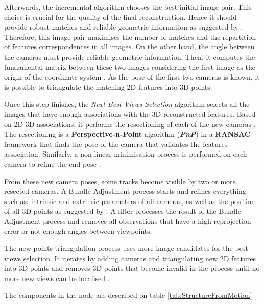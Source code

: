 \documentclass[12pt]{report}
\begin{document}
Afterwards, the incremental algorithm chooses the best initial image pair. This choice is crucial for the quality of the final reconstruction. Hence it should provide robust matches and reliable geometric information as suggested by \citet*{Moulon2012}.
Therefore, this image pair maximises the number of matches and the repartition of features correspondences in all images. On the other hand, the angle between the cameras must provide reliable geometric information.
Then, it computes the fundamental matrix between these two images considering the first image as the origin of the coordinate system . As the pose of the first two cameras is known, 
it is possible to triangulate the matching 2D features into 3D points. 

Once this step finishes, the \textit{Next Best Views Selection} algorithm selects all the images that have enough associations with the 3D reconstructed features.
Based on 2D-3D associations, it performs the resectioning of each of the new cameras \citep*{Lepetit2008EPnPAA}. The resectioning is a \textbf{Perspective-n-Point} algorithm (\textbf{\textit{PnP}}) in a
\textbf{RANSAC} framework that finds the pose of the camera that validates the features association. Similarly, a non-linear minimisation process is performed on each camera to refine the end pose \citep*{Nister2004}.

From these new camera poses, some tracks become visible by two or more resected cameras. A Bundle Adjustment process starts and refines everything such as:
intrinsic and extrinsic parameters of all cameras, as well as the position of all 3D points as suggested by \citet*{Shah2014}. A filter processes the result of the Bundle Adjustment process and removes all observations that have a high reprojection error or not enough angles between viewpoints.

 The new points triangulation process uses more image candidates for the best views selection. It iterates by adding cameras and triangulating new 2D features into 3D points and removes 3D points that become invalid in the process until no more new views can be localised \citep*{Shah2014}.

The components in the node are described on table \ref{tab:StructureFromMotion}
\end{document}
